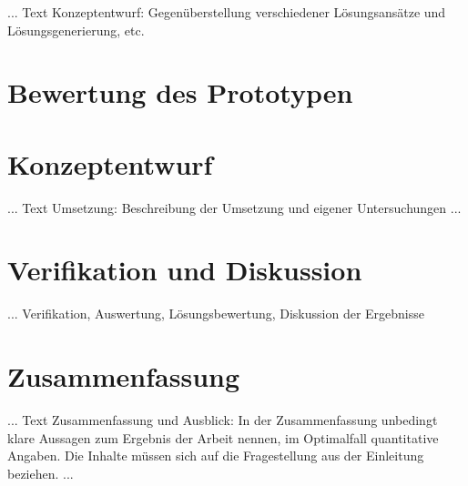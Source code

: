 ... Text Konzeptentwurf: Gegenüberstellung verschiedener Lösungsansätze und Lösungsgenerierung, etc.

\chapter{Bewertung des Prototypen}
\label{cha:Bewertung}

\chapter{Konzeptentwurf}
\label{cha:Konzeptentwurf}

... Text Umsetzung: Beschreibung der Umsetzung und eigener Untersuchungen ...



\chapter{Verifikation und Diskussion}
\label{cha:Verifikation}

... Verifikation, Auswertung, Lösungsbewertung, Diskussion der Ergebnisse

\chapter{Zusammenfassung}
\label{cha:zusammenfassung}

... Text Zusammenfassung und Ausblick: In der Zusammenfassung unbedingt klare Aussagen zum Ergebnis der Arbeit nennen, im Optimalfall quantitative Angaben. Die Inhalte müssen sich auf die Fragestellung aus der Einleitung  beziehen. ...